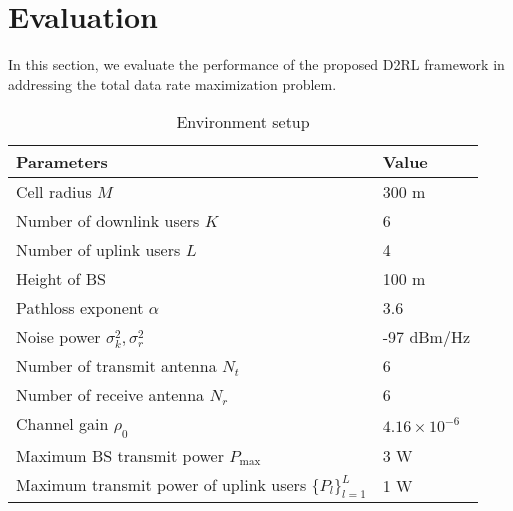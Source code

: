 \documentclass[comsoc,journal]{IEEEtran}
\begin{document}
\section{Evaluation}
\label{sec:evaluation}
In this section, we evaluate the performance of the proposed D2RL framework in addressing the total data rate maximization problem.

\begin{table}[ht]
\centering
\caption{Environment setup}
\label{table1}
\begin{tabular}{l l}
\hline
\textbf{Parameters} & \textbf{Value} \\ \hline
Cell radius $M$ & 300 m \\ 
Number of downlink users $K$ & 6 \\ 
Number of uplink users $L$ & 4 \\ 
Height of BS  & 100 m \\ 
Pathloss exponent $\alpha$ & 3.6 \\ 
Noise power $\sigma_k^2, \sigma_r^2$& -97 dBm/Hz \\ 
Number of transmit antenna $N_t$ & 6 \\
Number of receive antenna $N_r$ & 6 \\
Channel gain $\rho_0$ & $4.16 \times 10^{-6}$ \\  
Maximum BS transmit power $P_\text{max}$ & 3 W \\ 
\makecell[l]{Maximum transmit power of\\ uplink users $\{P_l\}_{l=1}^L$} & 1 W \\
\hline
\end{tabular}
\end{table}
\end{document}
